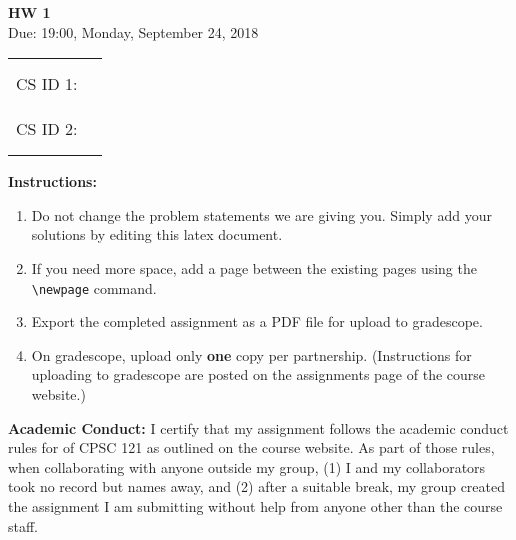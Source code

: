 \documentclass[a4paper, 20pt]{article}
\begin{document}

\begin{center}
    \LARGE
    \textbf{HW 1}
    \\[1ex]
    \Large Due: 19:00, Monday, September 24, 2018  \\
\end{center}
    \LARGE
\begin{tabular}{rl}
 & \\
CS ID 1: & \rule{3cm}{0.25mm}\\
 & \\
CS ID 2: & \rule{3cm}{0.25mm}\\
 & \\
\end{tabular}
\large

\textbf{Instructions:}
\begin{enumerate}
\item Do not change the problem statements we are giving you. Simply add your solutions by editing this latex document. 
\item If you need more space, add a page between the existing pages using the \texttt{\textbackslash newpage} command.
\item Export the completed assignment as a PDF file for upload to gradescope.
\item On gradescope, upload only \textbf{one} copy per partnership. (Instructions for uploading to gradescope are posted on the assignments page of the course website.)
\end{enumerate}

\textbf{Academic Conduct:} 
I certify that my assignment follows the academic conduct rules for of CPSC 121 as outlined on the course website. As part of those rules, when collaborating with anyone outside my group, (1) I and my collaborators took no record but names away, and (2) after a suitable break, my group created the assignment I am submitting without help from anyone other than the course staff. \\
\newpage
\begin{enumerate}

\newpage

\newpage

\newpage

\newpage

\end{enumerate}
\end{document}
